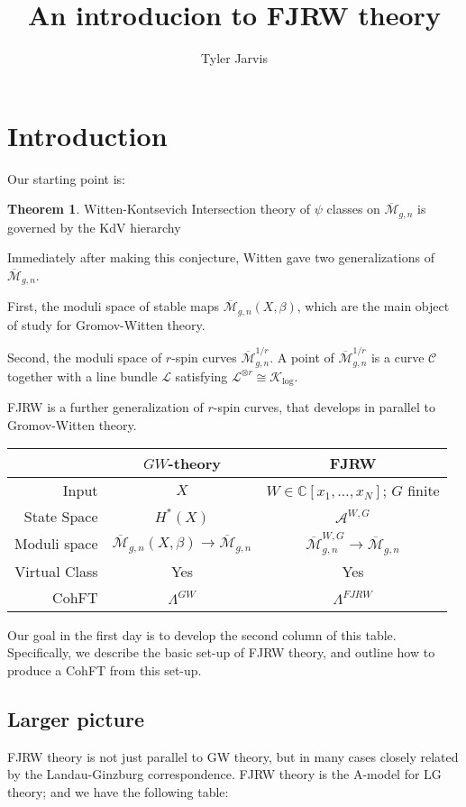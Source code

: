 \documentclass{amsart}
\title{An introducion to FJRW theory}
\author{Tyler Jarvis}
\theoremstyle{definition}
\newtheorem{theorem}[dummy]{Theorem}
\newcommand{\Mbar}{\overline{\mathcal{M}}}
\newcommand{\C}{\mathbb{C}}
\begin{document}
\maketitle

\section{Introduction}
Our starting point is:

\begin{theorem}{Witten-Kontsevich}
Intersection theory of $\psi$ classes on $\Mbar_{g,n}$ is governed by the KdV hierarchy
\end{theorem}

Immediately after making this conjecture, Witten gave two generalizations of $\Mbar_{g,n}$. 

First, the moduli space of stable maps $\Mbar_{g,n}(X,\beta)$, which are the main object of study for Gromov-Witten theory.

Second, the moduli space of $r$-spin curves $\Mbar^{1/r}_{g,n}$.  
A point of  $\Mbar^{1/r}_{g,n}$ is a curve $\mathcal{C}$ together with a line bundle $\mathcal{L}$ satisfying $\mathcal{L}^{\otimes r}\cong \mathcal{K}_{\log}$.

FJRW is a further generalization of $r$-spin curves, that develops in parallel to Gromov-Witten theory.

\begin{center}
\begin{tabular}{rcc}
 & $GW$-theory & FJRW \\
\hline
Input & $X$ & $W\in \C[x_1,\dots, x_N]$; $G$ finite \\
State Space & $H^*(X)$ & $\mathcal{A}^{W,G}$ \\
Moduli space & $\Mbar_{g,n}(X,\beta)\to \Mbar_{g,n}$ & $\Mbar_{g,n}^{W,G}\to\Mbar_{g,n}$ \\
Virtual Class & Yes & Yes \\
CohFT & $\Lambda^{GW}$ & $\Lambda^{FJRW}$
\end{tabular}
\end{center}

Our goal in the first day is to develop the second column of this table.  
Specifically, we describe the basic set-up of FJRW theory, and outline how to produce a CohFT from this set-up.

\subsection{Larger picture}
FJRW theory is not just parallel to GW theory, but in many cases closely related by the Landau-Ginzburg correspondence.  
FJRW theory is the A-model for LG theory; and we have the following table:
\end{document}
